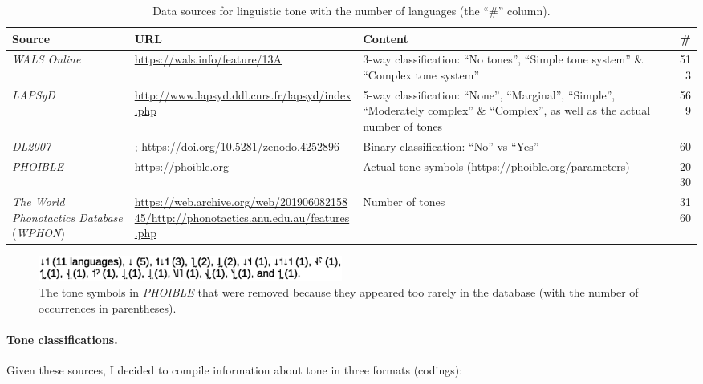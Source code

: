 \documentclass[twoside,onecolumn]{article}
\begin{document}
\begin{table}[h]
  \caption{Data sources for linguistic tone with the number of languages (the ``\#'' column).}
  \label{Tab:tone_data_surces}
  \centering
  \begin{tabularx}{\textwidth}{|X|X|X|r|}
    \toprule
    \textbf{Source} & \textbf{URL} & \textbf{Content} & \textbf{\#} \\
    \midrule
    \textit{WALS Online} \citep{dryer_wals_2013} & \url{https://wals.info/feature/13A} & 3-way classification: ``No tones'', ``Simple tone system'' \& ``Complex tone system''  & 513 \\
    \textit{LAPSyD} & \url{http://www.lapsyd.ddl.cnrs.fr/lapsyd/index.php} & 5-way classification: ``None'', ``Marginal'', ``Simple'', ``Moderately complex'' \& ``Complex'', as well as the actual number of tones  & 569 \\
    \textit{DL2007} \citep{dediu_ladd_2007} & \citet[Annex 6, p. 373--386]{dediu_phd_2007}; \url{https://doi.org/10.5281/zenodo.4252896} & Binary classification: ``No'' vs ``Yes''  & 60 \\
    \textit{PHOIBLE} \citep{moran_phoible_2014} & \url{https://phoible.org} & Actual tone symbols (\url{https://phoible.org/parameters})  & 2030 \\
    \textit{The World Phonotactics Database} (\textit{WPHON}) \citep{donohue_world_2013} & \url{https://web.archive.org/web/20190608215845/http://phonotactics.anu.edu.au/features.php} & Number of tones  & 3160 \\
    \bottomrule
  \end{tabularx}
\end{table}

\begin{figure}[h]
  \centering
  \includegraphics[width=10cm]{phoible_rare_tone_symbols}
  \caption{The tone symbols in \textit{PHOIBLE} that were removed because they appeared too rarely in the database (with the number of occurrences in parentheses).}
  \label{Fig:rare_phoible_tone_symbols}
\end{figure}


\paragraph{Tone classifications.}

Given these sources, I decided to compile information about tone in three formats (codings):
\end{document}
